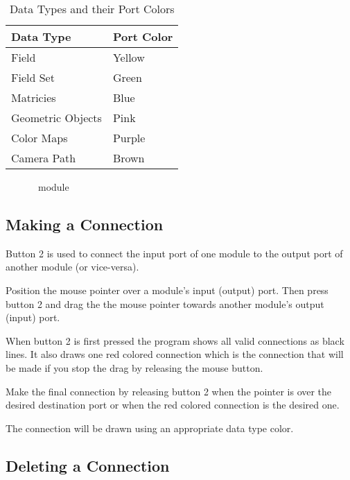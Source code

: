 \begin{table}[htbp]
  \begin{center}
    \begin{tabular}{|l|l|}
      \textbf{Data Type} & \textbf{Port Color} \\
      \hline
      Field & Yellow \\
      Field Set & Green \\
      Matricies & Blue \\
      Geometric Objects & Pink \\
      Color Maps & Purple \\
      Camera Path & Brown \\
      \hline
    \end{tabular}
    \caption{Data Types and their Port Colors}
    \label{tab:portcolors}
  \end{center}
\end{table}


\begin{figure}[htb]
  \begin{makeimage}
  \end{makeimage}
  \modgraphic
  \caption{\label{fig:module} \sr\ module}
\end{figure}


\subsection{Making a Connection}
\label{sec:connectmods}

Button 2 is used to connect the input port of one module to
the output port of another module (or vice-versa).  

Position the mouse pointer over a module's input (output) port.  Then press
button 2 and drag the the mouse pointer towards another module's output (input)
port.   

When button 2 is first pressed the program shows all valid connections as
black lines.  It also draws one red colored connection which is the
connection that will be made if you stop the drag by releasing the mouse
button.

Make the final connection by releasing button 2 when the pointer is over
the desired destination port or when the red colored connection is the
desired one.

The connection will be drawn using an appropriate data type color.

\subsection{Deleting a Connection}
\label{sec:deleteconnections}

